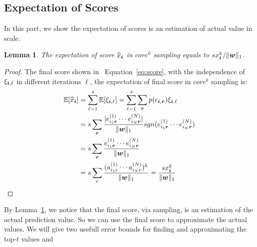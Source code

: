 \documentclass[letterpaper]{article}
\newcommand{\Sca}[3]{{#1}^{(#2)}_{i_#2#3}}%
\newcommand{\anr}[2]{\Sca{a}{#1}{#2}}
\newcommand{\enr}[2]{\Sca{e}{#1}{\V{#2}}}
\newcommand{\score}[1]{\xi_{\V{i},#1}}
\newcommand{\V}[1]{{\bm{{\MakeLowercase{#1}}}}}
\newcommand{\norm}[2]{\|#1\|_{#2}}
\newcommand{\Eqn}[1]   {Equation~\ref{eq:#1}}
\newcommand{\Lem}[1]  {Lemma~\ref{lem:#1}}
\newcommand{\predx}{\widehat{x}_{\V{i}}}
\newtheorem{lemma}{Lemma}
\begin{document}
\subsection{Expectation of Scores}
In this part, we show the expectation of scores is an estimation of actual value in scale.
\begin{lemma}\label{lem:Expectation}
The expectation of score $\widehat{x}_{\V{i}}$ in $core^k$ sampling equals to $sx^k_{\V{i}}/\norm{\V{w}}{1}$.
\end{lemma}
\begin{proof}
    The final score shown in ~\Eqn{score},
    with the independence of $\score{\ell}$ in different iterations $\ell$,
    the expectation of final score in  $core^k$ sampling is:
\begin{align*}
\mathbb{E}[\predx]
& = \sum_{\ell=1}^{s}\mathbb{E}[\score{\ell}] = \sum_{\ell=1}^{s}\sum_{\V{r}} p(\epsilon_{\V{i},\V{r}})\score{\ell} \\
& = s\sum_{\V{r}} \frac{|\enr{1}{r}\cdots\enr{N}{r}|}{\norm{\V{W}}{1}}
                  sgn(\enr{1}{r}\cdots\enr{N}{r})\\
& = s\sum_{\V{r}} \frac{\enr{1}{r}\cdots\enr{N}{r}}{\norm{\V{W}}{1}}\\
& = s\sum_{r}\frac{(\anr{1}{r}\cdots\anr{N}{r})^k}{\norm{\V{W}}{1}}
= \frac{sx^k_{\V{i}}}{\norm{\V{w}}{1}}
\end{align*}
\end{proof}
By \Lem{Expectation}, we notice that the final score, via sampling,
is an estimation of the actual prediction value.
So we can use the final score to approximate the actual values.
We will give two usefull error bounds for finding and approximating the top-$t$ values and
\end{document}
